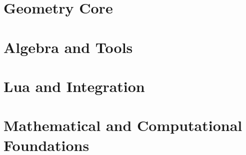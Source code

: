 \documentclass[
  DIV=16,
  fontsize=10,
  index=totoc,
  twoside,
  cadre,
  headings=small
]{tkz-doc}
\begin{document}
\clearpage
\newpage

\part{Geometry Core}























\part{Algebra and Tools}



 








\part{Lua and Integration}










\part{Mathematical and Computational Foundations}
 



\clearpage\newpage
\small\printindex
\end{document}
